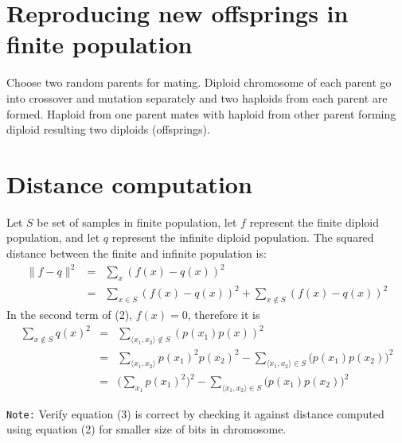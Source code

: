 \documentclass[a4paper]{article}
\begin{document}
\section*{Reproducing new offsprings in finite population}
\begin{flushleft}
Choose two random parents for mating. 
\linebreak
Diploid chromosome of each parent go into crossover and mutation separately and two haploids from each parent are formed.
\linebreak
Haploid from one parent mates with haploid from other parent forming diploid resulting two diploids (offsprings).

\end{flushleft}

\section*{Distance computation}
\begin{flushleft}
Let $S$ be set of samples in finite population, let $f$ represent the
finite diploid population, and let $q$ represent the infinite diploid
population.  The squared distance between the finite and infinite
population is:
\begin{eqnarray}
\|f - q\|^2  & = &
\sum_{x} (f(x)-q(x))^2 \nonumber \\
& = &
\sum_{x \in S} (f(x)-q(x))^2 + \sum_{x \notin S} (f(x)-q(x))^2
\end{eqnarray}
In the second term of (2), $f(x) = 0$, therefore it is
\begin{eqnarray}
\sum_{x\notin S} q(x)^2 & = & \sum_{\langle x_1, x_2 \rangle\notin S}(p(x_1)p(x))^2 \nonumber \\
& = &
\sum_{\langle x_1, x_2 \rangle} p(x_1)^2p(x_2)^2  - \sum_{\langle x_1, x_2 \rangle\in S}  \big( p(x_1) p(x_2) \big)^2 \nonumber \\
& = &
\Big( \sum_{x_1} p(x_1)^2 \Big)^2 - \sum_{\langle x_1, x_2 \rangle\in S} \big( p(x_1) p(x_2) \big)^2
\end{eqnarray}

\texttt{Note:} Verify equation (3) is correct by checking it against
distance computed using equation (2) for smaller size of bits in
chromosome.




\end{flushleft}
\end{document}
